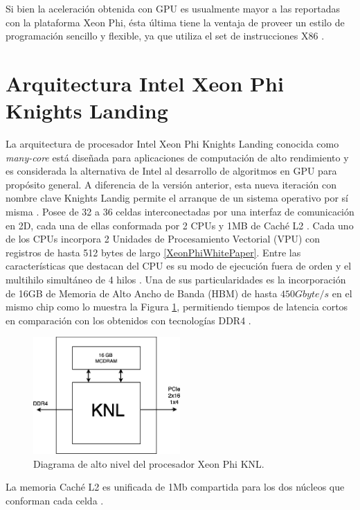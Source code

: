 Si bien la aceleraci\'on obtenida con GPU es usualmente mayor a las reportadas con la plataforma Xeon Phi, \'esta \'ultima tiene la ventaja de proveer un estilo de programaci\'on sencillo y flexible, ya que utiliza el set de instrucciones X86 \cite{huang2017parallel}. 

\section{Arquitectura Intel Xeon Phi Knights Landing}
\label{ch:marco_xeonphi}

La arquitectura de procesador Intel Xeon Phi Knights Landing conocida como \textit{many-core} est\'a dise\~nada para aplicaciones de computaci\'on de alto rendimiento y es considerada la alternativa de Intel al desarrollo de algoritmos en GPU para prop\'osito general. A diferencia de la versi\'on anterior, esta nueva iteraci\'on con nombre clave Knights Landig permite el arranque de un sistema operativo por s\'i misma \cite{XeonPhiWhitePaper}. Posee de 32 a 36 celdas interconectadas por una interfaz de comunicaci\'on en 2D, cada una de ellas conformada por 2 CPUs y 1MB de Cach\'e L2 \cite{XeonPhiWhitePaper}. Cada uno de los CPUs incorpora 2 Unidades de Procesamiento Vectorial (VPU) con registros de hasta 512 bytes de largo \ref{XeonPhiWhitePaper}. 
Entre las caracter\'isticas que destacan del CPU es su modo de ejecuci\'on fuera de orden y el multihilo simult\'aneo de 4 hilos \cite{XeonPhiWhitePaper}. Una de sus particularidades es la incorporaci\'on de 16GB de Memoria de Alto Ancho de Banda (HBM) de hasta $450 Gbyte/s$ en el mismo chip como lo muestra la Figura \ref{fig:cpu_phi}, permitiendo tiempos de latencia cortos en comparaci\'on con los obtenidos con tecnolog\'ias DDR4 \cite{XeonPhiWhitePaper}.

\begin{figure}[H]
\centering
\includegraphics[width=0.5\textwidth]{fig/cpu}
\caption{Diagrama de alto nivel del procesador Xeon Phi KNL.}
\label{fig:cpu_phi}
\end{figure}


La memoria Cach\'e L2 es unificada de 1Mb compartida para los dos n\'ucleos que conforman cada celda \cite{XeonPhiWhitePaper}.
